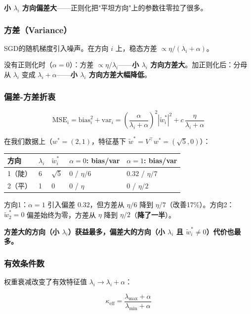 \documentclass[12pt,a4paper]{article}
\begin{document}
\textbf{小 $\lambda_i$ 方向偏差大}——正则化把"平坦方向"上的参数往零拉了很多。

\subsubsection{方差（Variance）}

SGD的随机梯度引入噪声。在方向 $i$ 上，稳态方差 $\propto \eta/(\lambda_i + \alpha)$。

没有正则化时（$\alpha=0$）：方差 $\propto \eta/\lambda_i$——\textbf{小 $\lambda_i$ 方向方差大}。加正则化后：分母从 $\lambda_i$ 变成 $\lambda_i + \alpha$——\textbf{小 $\lambda_i$ 方向方差大幅降低}。

\subsubsection{偏差-方差折衷}

\[\text{MSE}_i = \text{bias}_i^2 + \text{var}_i = \left(\frac{\alpha}{\lambda_i+\alpha}\right)^2 |\tilde{w}^*_i|^2 + c\,\frac{\eta}{\lambda_i+\alpha}\]

在我们数据上（$w^* = (2,1)$，特征基下 $\tilde{w}^* = V^\top w^* = (\sqrt{5}, 0)$）：

\begin{center}\small
\begin{longtable}{|l|l|l|l|l|}
\hline
方向 & $\lambda_i$ & $\tilde{w}^*_i$ & $\alpha=0$: bias/var & $\alpha=1$: bias/var \\
\hline
1（陡） & 6 & $\sqrt{5}$ & $0$ / $\eta/6$ & $0.32$ / $\eta/7$ \\
2（平） & 1 & $0$ & $0$ / $\eta$ & $0$ / $\eta/2$ \\
\hline
\end{longtable}
\end{center}

方向1：$\alpha=1$ 引入偏差 $0.32$，但方差从 $\eta/6$ 降到 $\eta/7$（改善17\%）。方向2：$\tilde{w}^*_2 = 0$ 偏差始终为零，方差从 $\eta$ 降到 $\eta/2$（\textbf{降了一半}）。

\textbf{方差大的方向（小 $\lambda_i$）获益最多，偏差大的方向（小 $\lambda_i$ 且 $\tilde{w}^*_i \neq 0$）代价也最多。}

\subsubsection{有效条件数}

权重衰减改变了有效特征值 $\lambda_i \to \lambda_i + \alpha$：

\[\kappa_{\text{eff}} = \frac{\lambda_{\max} + \alpha}{\lambda_{\min} + \alpha}\]
\end{document}
